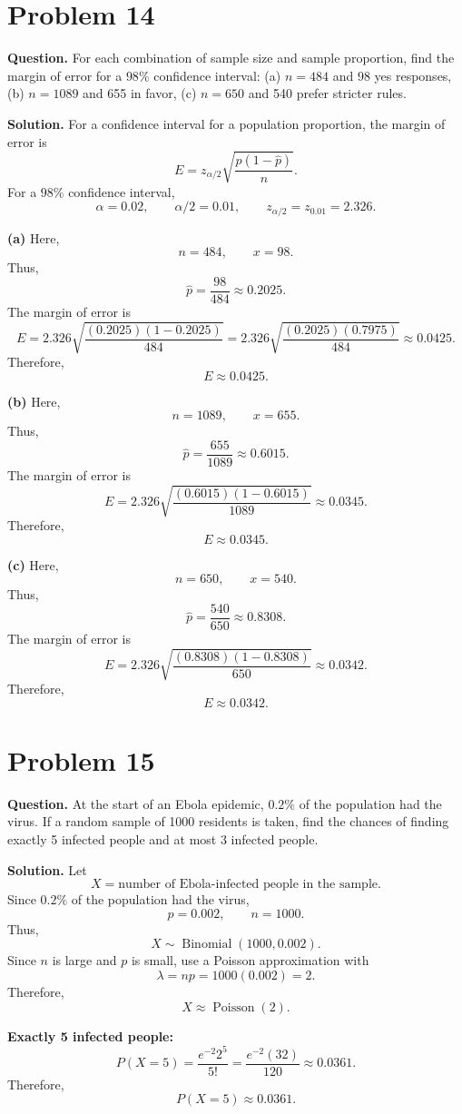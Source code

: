\documentclass[11pt]{article}
\begin{document}
\newpage
\section*{Problem 14}

\textbf{Question.} For each combination of sample size and sample proportion, find the margin of error for a $98\%$ confidence interval: (a) $n=484$ and 98 yes responses, (b) $n=1089$ and 655 in favor, (c) $n=650$ and 540 prefer stricter rules.

\textbf{Solution.} For a confidence interval for a population proportion, the margin of error is
\[
E=z_{\alpha/2}\sqrt{\frac{\hat p(1-\hat p)}{n}}.
\]
For a $98\%$ confidence interval,
\[
\alpha=0.02, \qquad \alpha/2=0.01, \qquad z_{\alpha/2}=z_{0.01}=2.326.
\]

\textbf{(a)} Here,
\[
n=484, \qquad x=98.
\]
Thus,
\[
\hat p=\frac{98}{484}\approx 0.2025.
\]
The margin of error is
\[
E=2.326\sqrt{\frac{(0.2025)(1-0.2025)}{484}}
=2.326\sqrt{\frac{(0.2025)(0.7975)}{484}}
\approx 0.0425.
\]
Therefore,
\[
\boxed{E\approx 0.0425}.
\]

\textbf{(b)} Here,
\[
n=1089, \qquad x=655.
\]
Thus,
\[
\hat p=\frac{655}{1089}\approx 0.6015.
\]
The margin of error is
\[
E=2.326\sqrt{\frac{(0.6015)(1-0.6015)}{1089}}
\approx 0.0345.
\]
Therefore,
\[
\boxed{E\approx 0.0345}.
\]

\textbf{(c)} Here,
\[
n=650, \qquad x=540.
\]
Thus,
\[
\hat p=\frac{540}{650}\approx 0.8308.
\]
The margin of error is
\[
E=2.326\sqrt{\frac{(0.8308)(1-0.8308)}{650}}
\approx 0.0342.
\]
Therefore,
\[
\boxed{E\approx 0.0342}.
\]

\newpage
\section*{Problem 15}

\textbf{Question.} At the start of an Ebola epidemic, $0.2\%$ of the population had the virus. If a random sample of 1000 residents is taken, find the chances of finding exactly 5 infected people and at most 3 infected people.

\textbf{Solution.} Let
\[
X=\text{number of Ebola-infected people in the sample}.
\]
Since $0.2\%$ of the population had the virus,
\[
p=0.002, \qquad n=1000.
\]
Thus,
\[
X\sim \operatorname{Binomial}(1000,0.002).
\]
Since $n$ is large and $p$ is small, use a Poisson approximation with
\[
\lambda=np=1000(0.002)=2.
\]
Therefore,
\[
X\approx \operatorname{Poisson}(2).
\]

\textbf{Exactly 5 infected people:}
\[
P(X=5)=\frac{e^{-2}2^5}{5!}=\frac{e^{-2}(32)}{120}\approx 0.0361.
\]
Therefore,
\[
\boxed{P(X=5)\approx 0.0361}.
\]
\end{document}
